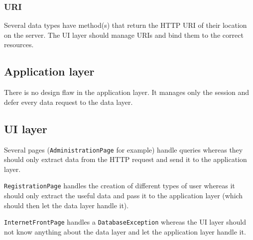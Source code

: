 \subsubsection{URI}
Several data types have method(s) that return the HTTP URI of their location on the server. The UI layer should manage URIs and bind them to the correct resources.





\subsection{Application layer}

There is no design flaw in the application layer. It manages only the session and defer every data request to the data layer.

\subsection{UI layer}

Several pages (\texttt{AdministrationPage} for example) handle queries whereas they should only extract data from the HTTP request and send it to the application layer.

\texttt{RegistrationPage} handles the creation of different types of user whereas it should only extract the useful data and pass it to the application layer (which should then let the data layer handle it).

\texttt{InternetFrontPage} handles a \texttt{DatabaseException} whereas the UI layer should not know anything about the data layer and let the application layer handle it.


